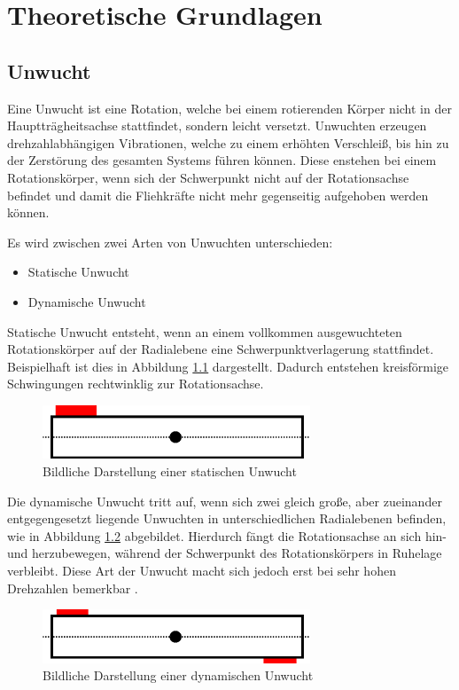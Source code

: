 
\chapter{Theoretische Grundlagen}

\section{Unwucht}
Eine Unwucht ist eine Rotation, welche bei einem rotierenden Körper nicht in der Hauptträgheitsachse stattfindet, sondern leicht versetzt.
Unwuchten erzeugen drehzahlabhängigen Vibrationen, welche zu einem erhöhten Verschleiß, bis hin zu der Zerstörung des gesamten Systems führen können.
Diese enstehen bei einem Rotationskörper, wenn sich der Schwerpunkt nicht auf der Rotationsachse befindet und damit die Fliehkräfte nicht mehr gegenseitig aufgehoben werden können. \cite{unwucht_wiki:2011}

Es wird zwischen zwei Arten von Unwuchten unterschieden:
\begin{itemize}
    \item Statische Unwucht
    \item Dynamische Unwucht
\end{itemize}

Statische Unwucht entsteht, wenn an einem vollkommen ausgewuchteten Rotationskörper auf der Radialebene eine Schwerpunktverlagerung stattfindet. Beispielhaft ist dies in Abbildung \ref{fig:static_imbalance} dargestellt.
Dadurch entstehen kreisförmige Schwingungen rechtwinklig zur Rotationsachse.
\begin{figure}[H]
    \centering
    \includegraphics[width=8cm]{images/chapter/02/static_imbalance.png}
    \caption{Bildliche Darstellung einer statischen Unwucht}
    \label{fig:static_imbalance}
\end{figure}

Die dynamische Unwucht tritt auf, wenn sich zwei gleich große, aber zueinander entgegengesetzt liegende Unwuchten in unterschiedlichen Radialebenen befinden, wie in Abbildung \ref{fig:dynamic_imbalance} abgebildet.
Hierdurch fängt die Rotationsachse an sich hin- und herzubewegen, während der Schwerpunkt des Rotationskörpers in Ruhelage verbleibt.
Diese Art der Unwucht macht sich jedoch erst bei sehr hohen Drehzahlen bemerkbar \cite[S. 8]{vibromatrix:2007}.
\begin{figure}[H]
    \centering
    \includegraphics[width=8cm]{images/chapter/02/dynamic_imbalance.png}
    \caption{Bildliche Darstellung einer dynamischen Unwucht}
    \label{fig:dynamic_imbalance}
\end{figure}

